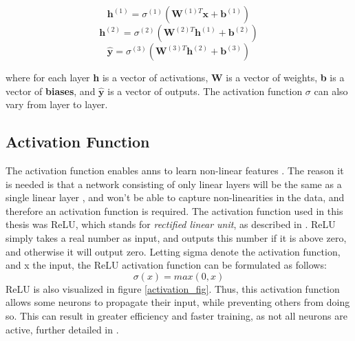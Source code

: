         \begin{equation}
            \textbf{h}^{(1)} = \sigma^{(1)}(\textbf{W}^{(1)T}\textbf{x} + \textbf{b}^{(1)})
        \end{equation}
        \begin{equation}
            \textbf{h}^{(2)} = \sigma^{(2)}(\textbf{W}^{(2)T}\textbf{h}^{(1)} + \textbf{b}^{(2)})
        \end{equation}
        \begin{equation} \label{mlp outputlayer eq}
            \hat{\textbf{y}} = \sigma^{(3)}(\textbf{W}^{(3)T}\textbf{h}^{(2)} + \textbf{b}^{(3)})
        \end{equation}
        
        where for each layer \textbf{h} is a vector of activations, \textbf{W} is a vector of weights, \textbf{b} is a  vector of \textbf{biases}, and $\hat{\textbf{y}}$ is a vector of outputs. The activation function $\sigma$ can also vary from layer to layer.
        
        
    \subsection{Activation Function} \label{activation function}
        The activation function enables \gls{ann}s to learn non-linear features \cite{razavi2021deep_exp_per}. The reason it is needed is that a network consisting of only linear layers will be the same as a single linear layer \cite{razavi2021deep_exp_per}, and won't be able to capture non-linearities in the data, and therefore an activation function is required. The activation function used in this thesis was ReLU, which stands for \textit{rectified linear unit}, as described in \citeauthor{sharma2019new_activation_func}\cite{sharma2019new_activation_func}. ReLU simply takes a real number as input, and outputs this number if it is above zero, and otherwise it will output zero. Letting sigma denote the activation function, and x the input, the ReLU activation function can be formulated as follows:
            \begin{equation} \label{relu_eq}
                \sigma(x) = max(0,x)
            \end{equation}
        ReLU is also visualized in figure \ref{activation_fig}. Thus, this activation function allows some neurons to propagate their input, while preventing others from doing so. This can result in greater efficiency and faster training, as not all neurons are active, further detailed in \citeauthor{sharma2019new_activation_func}\cite{sharma2019new_activation_func}. 
        
